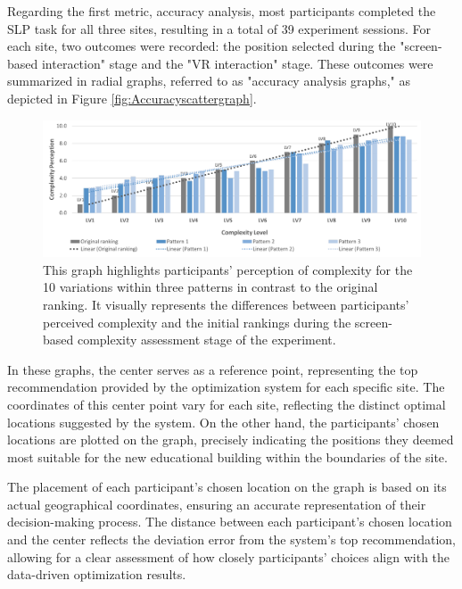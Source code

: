 Regarding the first metric, accuracy analysis, most participants completed the SLP task for all three sites, resulting in a total of 39 experiment sessions.
For each site, two outcomes were recorded: the position selected during the "screen-based interaction" stage and the "VR interaction" stage. These outcomes were summarized in radial graphs, referred to as "accuracy analysis graphs," as depicted in Figure \ref{fig:Accuracyscattergraph}.

        \begin{figure}[htb]
          \centering
          \includegraphics[width= \linewidth, trim=0 0 0 0]{Images/ComplexityPerceptionPerLevel}
          \caption{This graph highlights participants' perception of complexity for the 10 variations within three patterns in contrast to the original ranking. It visually represents the differences between participants' perceived complexity and the initial rankings during the screen-based complexity assessment stage of the experiment.}
          \label{fig:ComplexityPerceptionPerLevel}
        \end{figure}

In these graphs, the center serves as a reference point, representing the top recommendation provided by the optimization system for each specific site.
The coordinates of this center point vary for each site, reflecting the distinct optimal locations suggested by the system.
On the other hand, the participants' chosen locations are plotted on the graph, precisely indicating the positions they deemed most suitable for the new educational building within the boundaries of the site.

The placement of each participant's chosen location on the graph is based on its actual geographical coordinates, ensuring an accurate representation of their decision-making process.
The distance between each participant's chosen location and the center reflects the deviation error from the system's top recommendation, allowing for a clear assessment of how closely participants' choices align with the data-driven optimization results.

